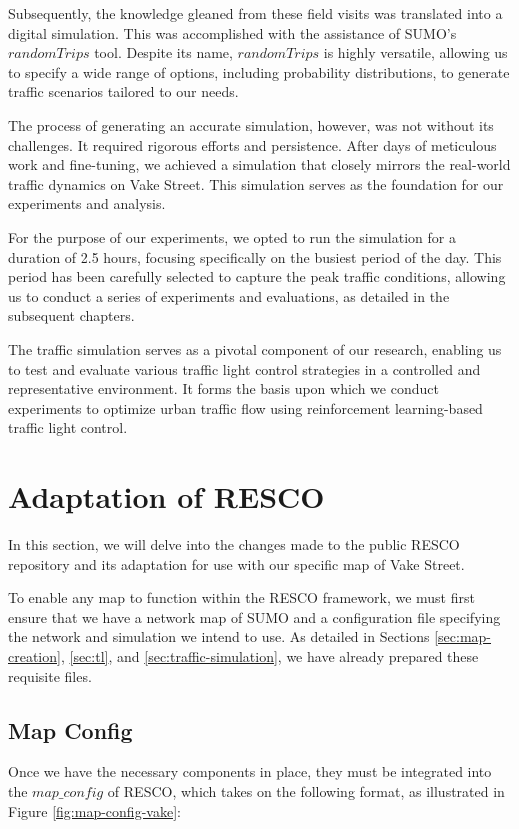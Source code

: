 Subsequently, the knowledge gleaned from these field visits was translated into a digital simulation. This was accomplished with the assistance of SUMO's $randomTrips$ tool. Despite its name, $randomTrips$ is highly versatile, allowing us to specify a wide range of options, including probability distributions, to generate traffic scenarios tailored to our needs.

The process of generating an accurate simulation, however, was not without its challenges. It required rigorous efforts and persistence. After days of meticulous work and fine-tuning, we achieved a simulation that closely mirrors the real-world traffic dynamics on Vake Street. This simulation serves as the foundation for our experiments and analysis.

For the purpose of our experiments, we opted to run the simulation for a duration of 2.5 hours, focusing specifically on the busiest period of the day. This period has been carefully selected to capture the peak traffic conditions, allowing us to conduct a series of experiments and evaluations, as detailed in the subsequent chapters.

The traffic simulation serves as a pivotal component of our research, enabling us to test and evaluate various traffic light control strategies in a controlled and representative environment. It forms the basis upon which we conduct experiments to optimize urban traffic flow using reinforcement learning-based traffic light control.


\section{Adaptation of RESCO}
In this section, we will delve into the changes made to the public RESCO repository and its adaptation for use with our specific map of Vake Street.

To enable any map to function within the RESCO framework, we must first ensure that we have a network map of SUMO and a configuration file specifying the network and simulation we intend to use. As detailed in Sections \ref{sec:map-creation}, \ref{sec:tl}, and \ref{sec:traffic-simulation}, we have already prepared these requisite files.

\newpage
\subsection{Map Config}
Once we have the necessary components in place, they must be integrated into the $map\_config$ of RESCO, which takes on the following format, as illustrated in Figure \ref{fig:map-config-vake}:


